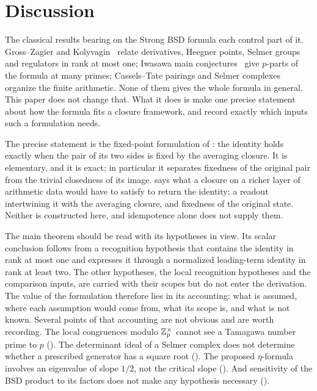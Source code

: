 \section{Discussion}\label{sec:discussion}

The classical results bearing on the Strong BSD formula each control part
of it.  Gross--Zagier and Kolyvagin~\citep{GrossZagier1986,Kolyvagin1989}
relate derivatives, Heegner points, Selmer groups and regulators in rank
at most one; Iwasawa main conjectures~\citep{SkinnerUrban2014} give
$p$-parts of the formula at many primes; Cassels--Tate pairings and
Selmer complexes~\citep{Flach1990,Nekovar2006} organize the finite
arithmetic.  None of them gives the whole formula in general.  This paper
does not change that.  What it does is make one precise statement about
how the formula fits a closure framework, and record exactly which inputs
such a formulation needs.

The precise statement is the fixed-point formulation of
: the identity holds exactly
when the pair of its two sides is fixed by the averaging closure.  It is
elementary, and it is exact; in particular it separates fixedness of the
original pair from the trivial closedness of its image.
 says what a closure on a richer
layer of arithmetic data would have to satisfy to return the identity: a
readout intertwining it with the averaging closure, and fixedness of the
original state.  Neither is constructed here, and idempotence alone does
not supply them.

The main theorem should be read with its hypotheses in view.  Its scalar
conclusion follows from a recognition hypothesis that contains the
identity in rank at most one and expresses it through a normalized
leading-term identity in rank at least two.  The other hypotheses, the
local recognition hypotheses and the comparison inputs, are carried with
their scopes but do not enter the derivation.  The value of the
formulation therefore lies in its accounting: what is assumed, where each
assumption would come from, what its scope is, and what is not known.
Several points of that accounting are not obvious and are worth
recording.  The local congruences modulo $\mathbb{Z}_p^\times$ cannot see a
Tamagawa number prime to $p$ ().  The
determinant ideal of a Selmer complex does not determine whether a
prescribed generator has a square root ().  The
proposed $\eta$-formula involves an eigenvalue of slope $1/2$, not the
critical slope ().  And sensitivity of the BSD
product to its factors does not make any hypothesis necessary
().

